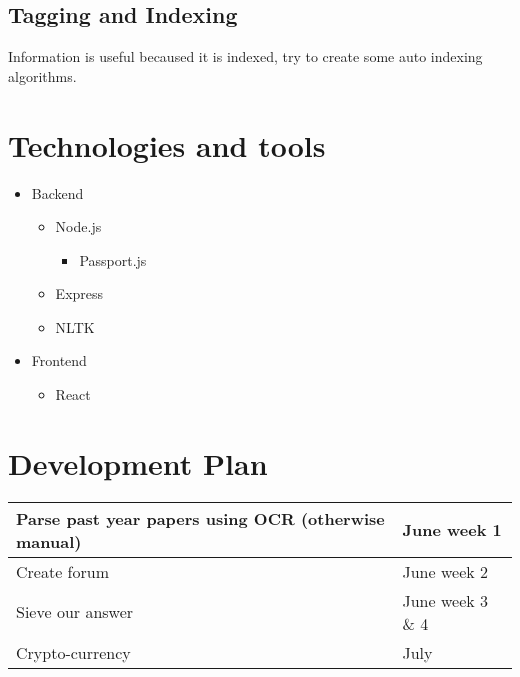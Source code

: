 \documentclass[36pt]{article}
\begin{document}
\subsection{Tagging and Indexing}
Information is useful becaused it is indexed, try to create some auto indexing algorithms.
\section{Technologies and tools}
\begin{itemize}
    \item Backend
    \begin{itemize}
        \item Node.js
            \begin{itemize}
                \item Passport.js
            \end{itemize}
        \item Express
        \item NLTK
     \end{itemize}
\item Frontend
    \begin{itemize}
        \item React
    \end{itemize}
\end{itemize}

\section{Development Plan}
\begin{tabular}[pos]{| l | l |}
    \hline
    Parse past year papers using OCR (otherwise manual) & June week 1 \\
    \hline
    Create forum & June week 2  \\
    \hline
    Sieve our answer & June week 3 \& 4 \\
    \hline
    Crypto-currency & July \\
    \hline
\end{tabular}
\end{document}
